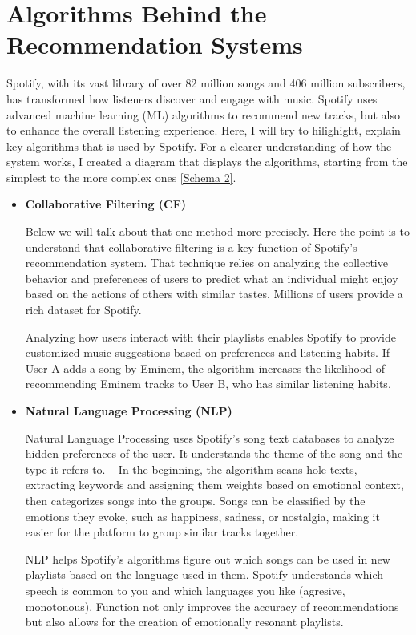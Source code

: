 \documentclass[12pt,a4paper]{article}
\begin{document}
\section{Algorithms Behind the Recommendation Systems}

Spotify, with its vast library of over 82 million songs and 406 million subscribers, has transformed how listeners discover and engage with music. Spotify uses advanced machine learning (ML) algorithms to recommend new tracks, but also to enhance the overall listening experience. Here, I will try to hilighight, explain key algorithms that is used by Spotify\citep{key}. For a clearer understanding of how the system works, I created a diagram that displays the algorithms, starting from the simplest to the more complex ones \autoref{Schema 2}.

\begin{itemize}
 \item \textbf{Collaborative Filtering (CF)}

Below we will talk about that one method more precisely. Here the point is to understand that collaborative filtering is a key function of Spotify's recommendation system. That technique relies on analyzing the collective behavior and preferences of users to predict what an individual might enjoy based on the actions of others with similar tastes. Millions of users provide a rich dataset for Spotify.

Analyzing how users interact with their playlists enables Spotify to provide customized music suggestions based on preferences and listening habits. If User A adds a song by Eminem, the algorithm increases the likelihood of recommending Eminem tracks to User B, who has similar listening habits\citep{key}.

 \item \textbf{Natural Language Processing (NLP)}

Natural Language Processing uses Spotify's song text databases to analyze hidden preferences of the user. It understands the theme of the song and the type it refers to.
 
In the beginning, the algorithm scans hole texts, extracting keywords and assigning them weights based on emotional context, then categorizes songs into the groups. Songs can be classified by the emotions they evoke, such as happiness, sadness, or nostalgia, making it easier for the platform to group similar tracks together.

NLP helps Spotify’s algorithms figure out which songs can be used in new playlists based on the language used in them. Spotify understands which speech is common to you and which languages you like (agresive, monotonous). Function not only improves the accuracy of recommendations but also allows for the creation of emotionally resonant playlists\citep{key}.


\end{itemize}
\end{document}
